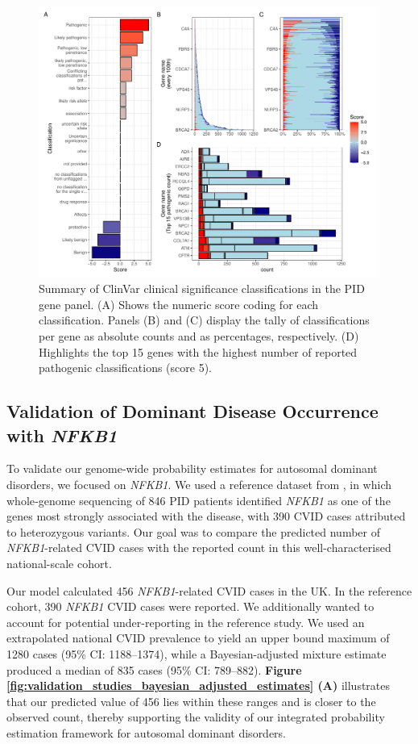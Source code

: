 \begin{figure}[ht]
  \centering
  \includegraphics[width=0.99\textwidth]{../images/p_varRisEst_summary_scores.pdf}
  \caption{Summary of ClinVar clinical significance classifications in the PID gene panel. (A) Shows the numeric score coding for each classification. Panels (B) and (C) display the tally of classifications per gene as absolute counts and as percentages, respectively. (D) Highlights the top 15 genes with the highest number of reported pathogenic classifications (score 5).}
  \label{fig:p_varRisEst_summary_scores}
\end{figure}


\subsection{Validation of Dominant Disease Occurrence with \textit{NFKB1}}

To validate our genome-wide probability estimates for autosomal dominant disorders, we focused on \textit{NFKB1}. We used a reference dataset from \citet{tuijnenburgNFKB12018}, in which whole‐genome sequencing of 846 PID patients identified \textit{NFKB1} as one of the genes most strongly associated with the disease, with 390 CVID cases attributed to heterozygous variants. Our goal was to compare the predicted number of \textit{NFKB1}-related CVID cases with the reported count in this well-characterised national-scale cohort.

Our model calculated 456 \textit{NFKB1}-related CVID cases in the UK. In the reference cohort,  390  \textit{NFKB1} CVID cases were reported. 
We additionally wanted to account for potential under-reporting in the reference study.
We used an extrapolated national CVID prevalence to yield an upper bound maximum of 1280 cases (95\% CI: 1188–1374), while a Bayesian-adjusted mixture estimate produced a median of 835 cases (95\% CI: 789–882). 
\textbf{Figure \ref{fig:validation_studies_bayesian_adjusted_estimates} (A)}
illustrates that our predicted value of 456 lies within these ranges and is closer to the observed count, thereby supporting the validity of our integrated probability estimation framework for autosomal dominant disorders.

